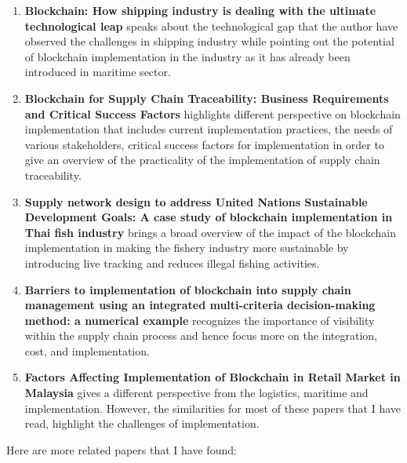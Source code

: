 \documentclass[11pt]{article}
\begin{document}
\begin{enumerate}
  \item \textbf{Blockchain: How shipping industry is dealing with the ultimate technological leap} speaks about the technological gap that the author have observed the challenges in shipping industry while pointing out the potential of blockchain implementation in the industry as it has already been introduced in maritime sector. \cite{bavassano_blockchain__nodate}
 
  \item \textbf{Blockchain for Supply Chain Traceability: Business Requirements and Critical Success Factors} highlights different perspective on blockchain implementation that includes current implementation practices, the needs of various stakeholders, critical success factors for implementation in order to give an overview of the practicality of the implementation of supply chain traceability. \cite{hastig_blockchain_2020}
  
  \item \textbf{Supply network design to address United Nations Sustainable Development Goals: A case study of blockchain implementation in Thai fish industry} brings a broad overview of the impact of the blockchain implementation in making the fishery industry more sustainable by introducing live tracking and reduces illegal fishing activities. \cite{naoum_supply_nodate}
  
  \item \textbf{Barriers to implementation of blockchain into supply chain management using an integrated multi-criteria decision-making method: a numerical example} recognizes the importance of visibility within the supply chain process and hence focus more on the integration, cost, and implementation. \cite{ozturk_barriers_2020}
  
  \item \textbf{Factors Affecting Implementation of Blockchain in Retail Market in Malaysia} gives a different perspective from the logistics, maritime and implementation. However, the similarities for most of these papers that I have read, highlight the challenges of implementation. \cite{dwyer_expanding_2007} 
  
\end{enumerate}

Here are more related papers that I have found:
\end{document}
